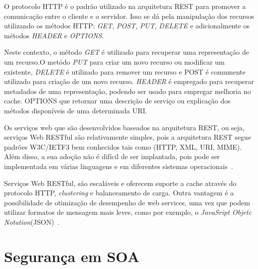 O protocolo HTTP é o padrão utilizado na arquitetura REST para promover a comunicação entre o cliente e o servidor. Isso se dá pela manipulação dos recursos utilizando os métodos HTTP: \emph{GET}, \emph{POST}, \emph{PUT}, \emph{DELETE} e adicionalmente os métodos \emph{HEADER} e \emph{OPTIONS}.

Neste contexto, o método \emph{GET} é utilizado para recuperar uma representação de um recurso.O metódo \emph{PUT} para criar um novo recurso ou modificar um existente, \emph{DELETE} é utilizado para remover um recurso e POST é comumente utilizado para criação de um novo recurso. \emph{HEADER} é empregado para recuperar metadados de uma representação, podendo ser usado para empregar melhoria no cache. OPTIONS que retornar uma descrição de serviço ou explicação dos métodos disponíveis de uma determinada URI.



%

Os serviços web que são desenvolvidos baseados na arquitetura REST, ou seja, serviços Web RESTful  são relativamente simples, pois a arquitetura REST segue padrões W3C/IETF3 bem conhecidos tais como (HTTP, XML, URI, MIME). Além disso, a sua adoção não é difícil de ser implantada, pois pode ser implementada em várias linguagens e em diferentes sistemas operacionais~\cite{Pautasso2008}.

Serviços Web RESTful, são escaláveis e oferecem suporte a cache através do protocolo HTTP, \emph{clustering} e balanceamento de carga. Outra vantagem é a possibilidade de otimização de desempenho de web services, uma vez que podem utilizar formatos de mensagem mais leves, como por exemplo, o \emph{JavaSript Objetc Notation}(JSON)~\cite{Pautasso2008}.


\section{Segurança em SOA}

